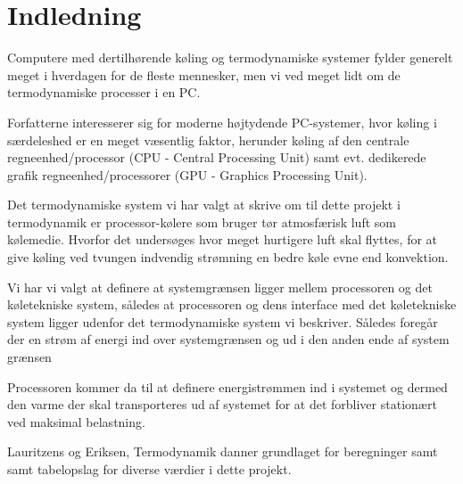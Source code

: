 \section{Indledning}

Computere med dertilhørende køling og termodynamiske systemer fylder generelt meget i hverdagen for de fleste mennesker, men vi ved meget lidt om de termodynamiske processer i en PC.

Forfatterne interesserer sig for moderne højtydende PC-systemer, hvor køling i særdeleshed er en meget væsentlig faktor, herunder køling af den centrale regneenhed/processor (CPU - Central Processing Unit) samt evt. dedikerede grafik regneenhed/processorer (GPU - Graphics Processing Unit).

Det termodynamiske system vi har valgt at skrive om til dette projekt i termodynamik er processor-kølere som bruger tør atmosfærisk luft som kølemedie. Hvorfor det undersøges hvor meget hurtigere luft skal flyttes, for at give køling ved tvungen indvendig strømning en bedre køle evne end konvektion.

Vi har vi valgt at definere at systemgrænsen ligger mellem processoren og det køletekniske system, således at processoren og dens interface med det køletekniske system ligger udenfor det termodynamiske system vi beskriver. Således foregår der en strøm af energi ind over systemgrænsen og ud i den anden ende af system grænsen

Processoren kommer da til at definere energistrømmen ind i systemet og dermed den varme der skal transporteres ud af systemet for at det forbliver stationært ved maksimal belastning. 

Lauritzens og Eriksen, Termodynamik danner grundlaget for beregninger samt samt tabelopslag for diverse værdier i dette projekt.

